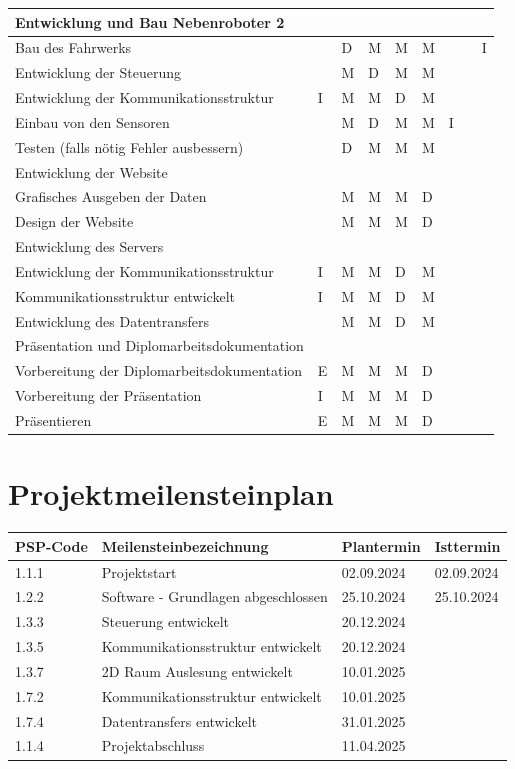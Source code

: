 \begin{longtable}[c]{|p{}|p{1cm}|p{1cm}|p{1cm}|p{1cm}|p{1cm}|p{1cm}|p{1cm}|p{}|}
Entwicklung und Bau Nebenroboter 2 & & & & & & & & \\
\hline
Bau des Fahrwerks & & D & M & M & M & & & I \\
\hline
Entwicklung der Steuerung & & M & D & M & M & & & \\
\hline
Entwicklung der Kommunikationsstruktur & I & M & M & D & M & & & \\
\hline
Einbau von den Sensoren & & M & D & M & M & I & & \\
\hline
Testen (falls nötig Fehler ausbessern) & & D & M & M & M & & & \\
\hline
Entwicklung der Website & & & & & & & & \\
\hline
Grafisches Ausgeben der Daten & & M & M & M & D & & & \\
\hline
Design der Website & & M & M & M & D & & & \\
\hline
Entwicklung des Servers & & & & & & & & \\
\hline
Entwicklung der Kommunikationsstruktur & I & M & M & D & M & & & \\
\hline
Kommunikationsstruktur entwickelt & I & M & M & D & M & & & \\
\hline
Entwicklung des Datentransfers & & M & M & D & M & & & \\
\hline
Präsentation und Diplomarbeitsdokumentation & & & & & & & & \\
\hline
Vorbereitung der Diplomarbeitsdokumentation & E & M & M & M & D & & & \\
\hline
Vorbereitung der Präsentation & I & M & M & M & D & & & \\
\hline
Präsentieren & E & M & M & M & D & & & \\
\hline
\end{longtable}

\newpage
\section{Projektmeilensteinplan}

\begin{longtable}[c]{|p{3cm}|p{6cm}|p{3cm}|l|}
\hline
\textbf{PSP-Code} & \textbf{Meilensteinbezeichnung} & \textbf{Plantermin} & \textbf{Isttermin} \\
\hline
1.1.1 & Projektstart & 02.09.2024 & 02.09.2024 \\
\hline
1.2.2 & Software - Grundlagen abgeschlossen & 25.10.2024 & 25.10.2024 \\
\hline
1.3.3 & Steuerung entwickelt & 20.12.2024 & \\
\hline
1.3.5 & Kommunikationsstruktur entwickelt & 20.12.2024 & \\
\hline
1.3.7 & 2D Raum Auslesung entwickelt & 10.01.2025 & \\
\hline
1.7.2 & Kommunikationsstruktur entwickelt & 10.01.2025 & \\
\hline
1.7.4 & Datentransfers entwickelt & 31.01.2025 & \\
\hline
1.1.4 & Projektabschluss & 11.04.2025 & \\
\hline
\end{longtable}

